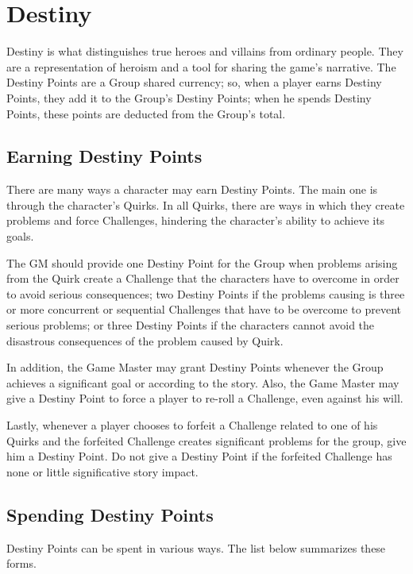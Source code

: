 \section{Destiny}\label{sec:destiny}
\begin{multicols}{2}
Destiny is what distinguishes true heroes and villains from ordinary people. They are a representation of heroism and a tool for sharing the game's narrative. The Destiny Points are a Group shared currency; so, when a player earns Destiny Points, they add it to the Group’s Destiny Points; when he spends Destiny Points, these points are deducted from the Group's total.

\subsection{Earning Destiny Points}\label{subsec:earndp}
\begin{wrapfigure}{r}{0.3\textwidth}
\end{wrapfigure}

There are many ways a character may earn Destiny Points. The main one is through the character's Quirks. In all Quirks, there are ways in which they create problems and force Challenges, hindering the character’s ability to achieve its goals.

The GM should provide one Destiny Point for the Group when problems arising from the Quirk create a Challenge that the characters have to overcome in order to avoid serious consequences; two Destiny Points if the problems causing is three or more concurrent or sequential Challenges that have to be overcome to prevent serious problems; or three Destiny Points if the characters cannot avoid the disastrous consequences of the problem caused by Quirk.

In addition, the Game Master may grant Destiny Points whenever the Group achieves a significant goal or according to the story. Also, the Game Master may give a Destiny Point to force a player to re-roll a Challenge, even against his will.

Lastly, whenever a player chooses to forfeit a Challenge related to one of his Quirks and the forfeited Challenge creates significant problems for the group, give him a Destiny Point. Do not give a Destiny Point if the forfeited Challenge has none or little significative story impact.

\subsection{Spending Destiny Points}\label{subsec:spenddp}
Destiny Points can be spent in various ways. The list below summarizes these forms.


\end{multicols}
